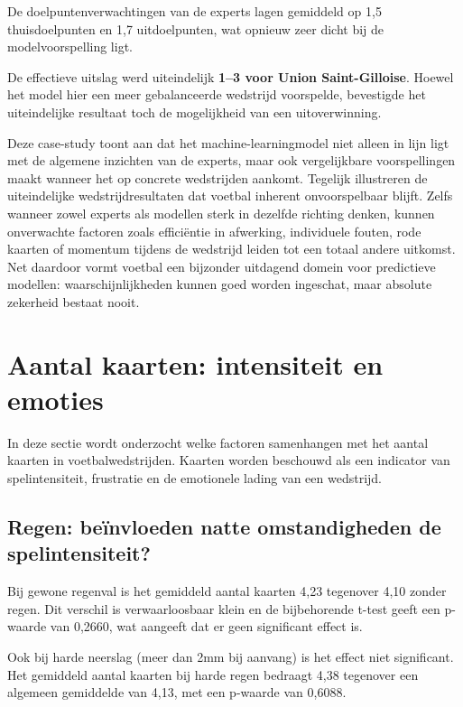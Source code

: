 De doelpuntenverwachtingen van de experts lagen gemiddeld op 1,5 thuisdoelpunten en 1,7 uitdoelpunten, wat opnieuw zeer dicht bij de modelvoorspelling ligt.

De effectieve uitslag werd uiteindelijk \textbf{1--3 voor Union Saint-Gilloise}.
Hoewel het model hier een meer gebalanceerde wedstrijd voorspelde, bevestigde het uiteindelijke resultaat toch de mogelijkheid van een uitoverwinning.

Deze case-study toont aan dat het machine-learningmodel niet alleen in lijn ligt met de algemene inzichten van de experts, maar ook vergelijkbare voorspellingen maakt wanneer het op concrete wedstrijden aankomt.
Tegelijk illustreren de uiteindelijke wedstrijdresultaten dat voetbal inherent onvoorspelbaar blijft. Zelfs wanneer zowel experts als modellen sterk in dezelfde richting denken, kunnen onverwachte factoren zoals efficiëntie in afwerking, individuele fouten, rode kaarten of momentum tijdens de wedstrijd leiden tot een totaal andere uitkomst.
Net daardoor vormt voetbal een bijzonder uitdagend domein voor predictieve modellen: waarschijnlijkheden kunnen goed worden ingeschat, maar absolute zekerheid bestaat nooit.


\section{Aantal kaarten: intensiteit en emoties}

In deze sectie wordt onderzocht welke factoren samenhangen met het aantal kaarten in voetbalwedstrijden.
Kaarten worden beschouwd als een indicator van spelintensiteit, frustratie en de emotionele lading van een wedstrijd.

\subsection{Regen: beïnvloeden natte omstandigheden de spelintensiteit?}

Bij gewone regenval is het gemiddeld aantal kaarten 4,23 tegenover 4,10 zonder regen.
Dit verschil is verwaarloosbaar klein en de bijbehorende t-test geeft een p-waarde van 0,2660, wat aangeeft dat er geen significant effect is.

\vspace{5pt}

Ook bij harde neerslag (meer dan 2mm bij aanvang) is het effect niet significant.
Het gemiddeld aantal kaarten bij harde regen bedraagt 4,38 tegenover een algemeen gemiddelde van 4,13, met een p-waarde van 0,6088.

